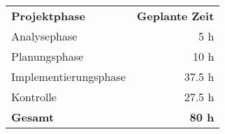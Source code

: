 \begin{tabular}{lr}
\rowcolor{heading}\textbf{Projektphase} & \textbf{Geplante Zeit} \\
Analysephase & 5 h \\
\rowcolor{odd}Planungsphase & 10 h \\
Implementierungsphase & 37.5 h \\
\rowcolor{odd}Kontrolle & 27.5 h \\
\hline
\hline
\rowcolor{odd}\textbf{Gesamt} & \textbf{80 h} \\
\end{tabular}
